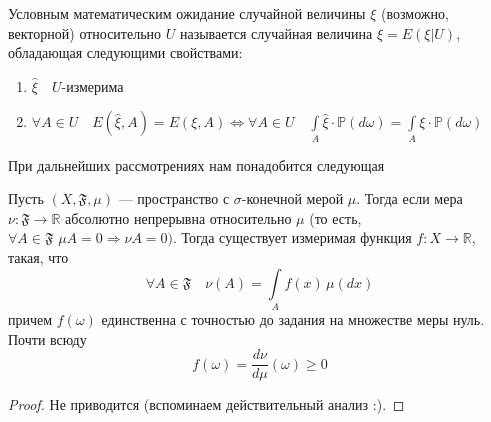 \documentclass[12pt, russian]{article}
\begin{document}
\begin{mydef}
Условным математическим ожидание случайной величины $\xi$ (возможно, векторной) относительно $U$ называется случайная величина $\hat{\xi} = E(\xi|U)$, обладающая следующими свойствами:
\begin{enumerate}
\item $\hat{\xi} \quad U$-измерима
\item $\forall A\in U\quad E(\hat{\xi}, A) = E(\xi, A) \Longleftrightarrow \forall A\in U\quad \int\limits_A{\hat{\xi}\cdot \mathbb{P}(d\omega)} = \int\limits_A{\xi\cdot \mathbb{P}(d\omega)}$
\end{enumerate}
\end{mydef}

\noindent При дальнейших рассмотрениях нам понадобится следующая
\begin{theorem}
Пусть $(X, \mathfrak{F}, \mu)$ --- пространство с $\sigma$-конечной мерой $\mu$. Тогда если мера $\nu:\mathfrak{F}\rightarrow\mathbb{R}$ абсолютно непрерывна относительно $\mu$ (то есть, $\forall A\in\mathfrak{F} \,\, \mu A = 0 \Rightarrow \nu A = 0)$. Тогда существует измеримая функция $f:X\rightarrow\mathbb{R}$, такая, что
$$ \forall A \in \mathfrak{F} \quad \nu(A) = \int\limits_A{f(x)\,\mu(dx)}$$
причем $f(\omega)$ единственна с точностью до задания на множестве меры нуль. Почти всюду 
$$ f(\omega) = \frac{d\nu}{d\mu}(\omega) \geq 0$$
\end{theorem}
\begin{proof}
Не приводится (вспоминаем действительный анализ :).
\end{proof}
\end{document}
